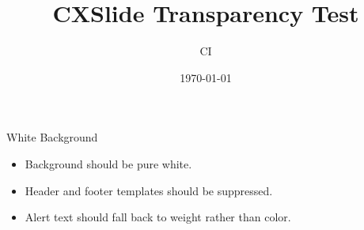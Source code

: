 \documentclass[aspectratio=169, UTF8, trans]{ctexbeamer}
\title{CXSlide Transparency Test}
\author{CI}
\date{\today}
\begin{document}
\begin{frame}
  \titlepage
\end{frame}

\begin{frame}{White Background}
  \begin{itemize}
    \item Background should be pure white.
    \item Header and footer templates should be suppressed.
    \item \alert{Alert text} should fall back to weight rather than color.
  \end{itemize}
\end{frame}
\end{document}
